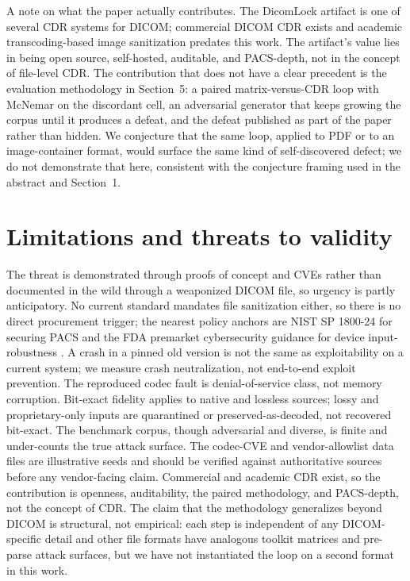\documentclass[11pt]{article}
\begin{document}
A note on what the paper actually contributes. The DicomLock artifact is one of several CDR systems for DICOM; commercial DICOM CDR exists and academic transcoding-based image sanitization predates this work. The artifact's value lies in being open source, self-hosted, auditable, and PACS-depth, not in the concept of file-level CDR. The contribution that does not have a clear precedent is the evaluation methodology in Section~5: a paired matrix-versus-CDR loop with McNemar on the discordant cell, an adversarial generator that keeps growing the corpus until it produces a defeat, and the defeat published as part of the paper rather than hidden. We conjecture that the same loop, applied to PDF or to an image-container format, would surface the same kind of self-discovered defect; we do not demonstrate that here, consistent with the conjecture framing used in the abstract and Section~1.

\section{Limitations and threats to validity}

The threat is demonstrated through proofs of concept and CVEs rather than documented in the wild through a weaponized DICOM file, so urgency is partly anticipatory. No current standard mandates file sanitization either, so there is no direct procurement trigger; the nearest policy anchors are NIST SP 1800-24 for securing PACS \cite{ref22} and the FDA premarket cybersecurity guidance for device input-robustness \cite{ref23}. A crash in a pinned old version is not the same as exploitability on a current system; we measure crash neutralization, not end-to-end exploit prevention. The reproduced codec fault is denial-of-service class, not memory corruption. Bit-exact fidelity applies to native and lossless sources; lossy and proprietary-only inputs are quarantined or preserved-as-decoded, not recovered bit-exact. The benchmark corpus, though adversarial and diverse, is finite and under-counts the true attack surface. The codec-CVE and vendor-allowlist data files are illustrative seeds and should be verified against authoritative sources before any vendor-facing claim. Commercial and academic CDR exist, so the contribution is openness, auditability, the paired methodology, and PACS-depth, not the concept of CDR. The claim that the methodology generalizes beyond DICOM is structural, not empirical: each step is independent of any DICOM-specific detail and other file formats have analogous toolkit matrices and pre-parse attack surfaces, but we have not instantiated the loop on a second format in this work.
\end{document}
